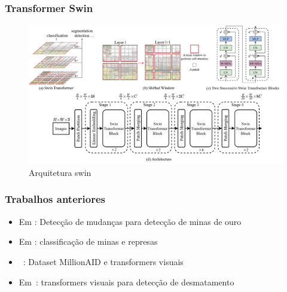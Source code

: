 \documentclass{beamer}
\begin{document}
\begin{frame}
    \frametitle{Transformer Swin}

    \begin{figure}[!ht]
        \centering
        \includegraphics[width=\columnwidth]{Imagens/arquitetura swin.png}
        \caption{Arquitetura swin ~\cite{liu2022swin}}
        \label{fig:SWIN-arquitetura}
    \end{figure}

\end{frame}

\begin{frame}
    \frametitle{Trabalhos anteriores}

    \begin{itemize}
        \item Em \cite{rs14071746}: Detecção de mudanças para detecção de minas de ouro
        \item Em \cite{s20236936}: classificação de minas e represas
        \item ~\cite{wang2022empirical}: Dataset MillionAID e transformers visuais
        \item Em~\cite{9701667}: transformers visuais para detecção de desmatamento
    \end{itemize}
\end{frame}
\end{document}
